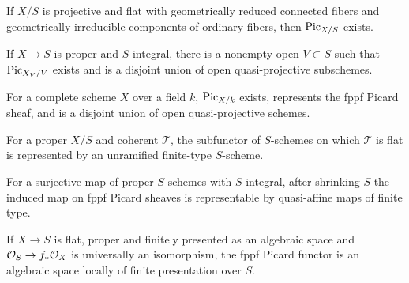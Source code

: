 \begin{theorem}\label{fga-thm-9-4-18-1}
If $X/S$ is projective and flat with geometrically reduced connected fibers and
geometrically irreducible components of ordinary fibers, then $\operatorname{Pic}_{X/S}$
exists.
\end{theorem}
\begin{theorem}\label{fga-thm-9-4-18-2}
If $X\to S$ is proper and $S$ integral, there is a nonempty open $V\subset S$
such that $\operatorname{Pic}_{X_V/V}$ exists and is a disjoint union of open
quasi-projective subschemes.
\end{theorem}
\begin{corollary}\label{fga-cor-9-4-18-3}
For a complete scheme $X$ over a field $k$, $\operatorname{Pic}_{X/k}$ exists, represents the
fppf Picard sheaf, and is a disjoint union of open quasi-projective schemes.
\end{corollary}
\begin{theorem}\label{fga-thm-9-4-18-4}
For a proper $X/S$ and coherent $\mathcal T$, the subfunctor of $S$-schemes on
which $\mathcal T$ is flat is represented by an unramified finite-type
$S$-scheme.
\end{theorem}
\begin{theorem}\label{fga-thm-9-4-18-5}
For a surjective map of proper $S$-schemes with $S$ integral, after shrinking
$S$ the induced map on fppf Picard sheaves is representable by quasi-affine
maps of finite type.
\end{theorem}
\begin{theorem}\label{fga-thm-9-4-18-6}
If $X\to S$ is flat, proper and finitely presented as an algebraic space and
$\mathcal O_S\to f_*\mathcal O_X$ is universally an isomorphism, the fppf Picard functor is
an algebraic space locally of finite presentation over $S$.
\end{theorem}


